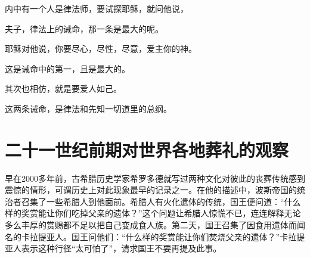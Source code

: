 \documentclass[12pt,oneside]{book}
\begin{document}
\begin{bookref}[frametitle={\cite{新约圣经四福音}}]
内中有一个人是律法师，要试探耶稣，就问他说，

夫子，律法上的诫命，那一条是最大的呢。

耶稣对他说，你要尽心，尽性，尽意，爱主你的神。

这是诫命中的第一，且是最大的。

其次也相仿，就是要爱人如己。

这两条诫命，是律法和先知一切道里的总纲。
\end{bookref}

\chapter{二十一世纪前期对世界各地葬礼的观察}

\begin{bookref}[frametitle={\cite{好好告别}}]
早在2000多年前，古希腊历史学家希罗多德就写过两种文化对彼此的丧葬传统感到震惊的情形，可谓历史上对此现象最早的记录之一。在他的描述中，波斯帝国的统治者召集了一些希腊人到他面前。希腊人有火化遗体的传统，国王便问道：“什么样的奖赏能让你们吃掉父亲的遗体？”这个问题让希腊人惊慌不已，连连解释无论多么丰厚的赏赐都不足以把自己变成食人族。第二天，国王召集了因食用遗体而闻名的卡拉提亚人。国王问他们：“什么样的奖赏能让你们焚烧父亲的遗体？”卡拉提亚人表示这种行径“太可怕了”，请求国王不要再提及此事。

\end{bookref}
\end{document}
